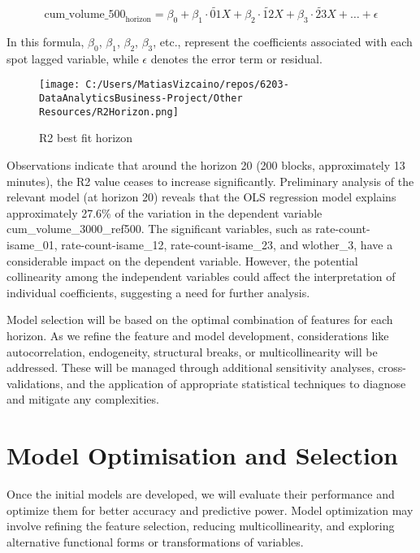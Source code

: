 \documentclass{article}
\begin{document}
{\[
\text{{cum\_volume\_500}}_\text{{horizon}} = \beta_0 + \beta_1 \cdot \widetilde{01}X + \beta_2 \cdot \widetilde{12}X + \beta_3 \cdot \widetilde{23}X + \ldots + \epsilon
\]

In this formula, \(\beta_0\), \(\beta_1\), \(\beta_2\), \(\beta_3\), etc., represent the coefficients associated with each spot lagged variable, while \(\epsilon\) denotes the error term or residual.

\begin{wrapfigure}[16]{l}{0.35\textwidth}
\vspace{0pt} %
\centering
\texttt{[image: C:/Users/MatiasVizcaino/repos/6203-DataAnalyticsBusiness-Project/Other Resources/R2Horizon.png]}
\caption{R2 best fit horizon}
\label{fig:R2-horizon}
\end{wrapfigure}

Observations indicate that around the horizon 20 (200 blocks, approximately 13 minutes), the R2 value ceases to increase significantly. Preliminary analysis of the relevant model (at horizon 20) reveals that the OLS regression model explains approximately 27.6\% of the variation in the dependent variable cum\_volume\_3000\_ref500. The significant variables, such as rate-count-isame\_01, rate-count-isame\_12, rate-count-isame\_23, and wlother\_3, have a considerable impact on the dependent variable. However, the potential collinearity among the independent variables could affect the interpretation of individual coefficients, suggesting a need for further analysis.

Model selection will be based on the optimal combination of features for each horizon. As we refine the feature and model development, considerations like autocorrelation, endogeneity, structural breaks, or multicollinearity will be addressed. These will be managed through additional sensitivity analyses, cross-validations, and the application of appropriate statistical techniques to diagnose and mitigate any complexities.


\section*{\textbf{Model Optimisation and Selection}}

Once the initial models are developed, we will evaluate their performance and optimize them for better accuracy and predictive power. Model optimization may involve refining the feature selection, reducing multicollinearity, and exploring alternative functional forms or transformations of variables.

}
\end{document}
